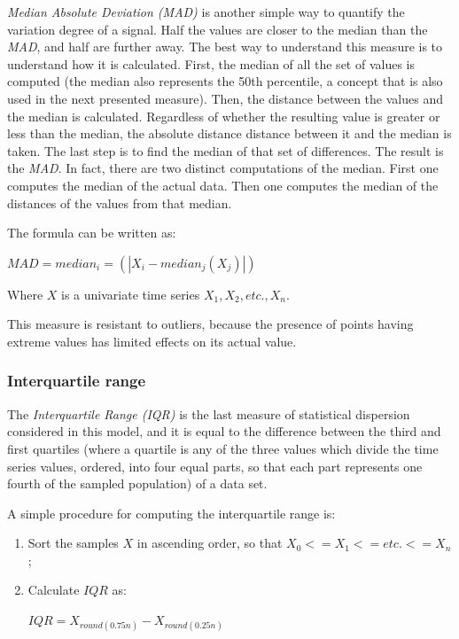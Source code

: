 \documentclass[12pt,a4paper,cucitura]{toptesi}
\begin{document}
\emph{Median Absolute Deviation (MAD)} is another simple way to quantify the variation degree of a signal.
Half the values are closer to the median than the \emph{MAD}, and half are further away.
The best way to understand this measure is to understand how it is calculated. 
First, the median of all the set of values is computed (the median also represents the 50th percentile, a concept that is also used in the next presented measure).
Then, the distance between the values and the median is calculated.
Regardless of whether the resulting value is greater or less than the median, the absolute distance distance between it and the median is taken.
The last step is to find the median of that set of differences. The result is the \emph{MAD}.
In fact, there are two distinct computations of the median. First one computes the median of the actual data. Then one computes the median of the distances of the values from that median. 

The formula can be written as:

\begin{center}
\Large
$MAD = median_i = (\left | X_i - median_j(X_j) \right |)$
\end{center}

Where $X$ is a univariate time series $X_1, X_2, etc., X_n$.

This measure is resistant to outliers, because the presence of points having extreme values has limited effects on its actual value.

\subsubsection{Interquartile range}

The \emph{Interquartile Range (IQR)} is the last measure of statistical dispersion considered in this model, and it is equal to the difference between the third and first quartiles (where a quartile is any of the three values which divide the time series values, ordered, into four equal parts, so that each part represents one fourth of the sampled population) of a data set. 

A simple procedure for computing the interquartile range is:

\begin{enumerate}
\item Sort the samples $X$ in ascending order, so that $X_0 <= X_1 <= etc. <= X_n$;
\item Calculate $IQR$ as:
\begin{center}
\Large
$IQR = X_{round(0.75n)} - X_{round(0.25n)}$
\end{center}
\end{enumerate}
\end{document}

